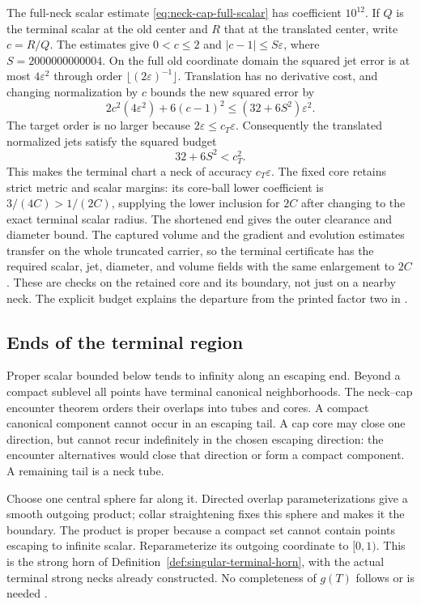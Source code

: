 The full-neck scalar estimate \eqref{eq:neck-cap-full-scalar} has coefficient
$10^{12}$. If $Q$ is the terminal scalar at the old center and $R$ that
at the translated center, write $c=R/Q$. The estimates give
$0<c\leq2$ and $|c-1|\leq S\varepsilon$, where
$S=2000000000004$. On the full old coordinate domain the squared jet
error is at most $4\varepsilon^2$ through order
$\lfloor(2\varepsilon)^{-1}\rfloor$. Translation has no derivative
cost, and changing normalization by $c$ bounds the new squared error by
\[
 2c^2(4\varepsilon^2)+6(c-1)^2
 \leq(32+6S^2)\varepsilon^2.
\]
The target order is no larger because $2\varepsilon\leq c_T\varepsilon$.
Consequently the translated normalized jets satisfy the squared budget
\begin{equation}
                         32+6S^2<c_T^2.
 \label{eq:singular-cap-budget}
\end{equation}
This makes the terminal chart a neck of accuracy $c_T\varepsilon$.
The fixed core retains strict metric and scalar margins: its core-ball lower
coefficient is $3/(4C)>1/(2C)$, supplying the lower inclusion for $2C$ after
changing to the exact terminal scalar radius. The shortened end gives the
outer clearance and diameter bound. The captured volume and the gradient and
evolution estimates transfer on the whole truncated carrier, so the terminal
certificate has the required scalar, jet, diameter, and volume fields with
the same enlargement to $2C$. These are checks on the retained core and its
boundary, not just on a nearby neck.
The explicit budget explains the departure from the printed factor two
in \cite[Lemma 11.23 and Claim 11.24, pp. 281--282]{MT2007}.

\subsection{Ends of the terminal region}

Proper scalar bounded below tends to infinity along an escaping end.
Beyond a compact sublevel all points have terminal canonical neighborhoods.
The neck--cap encounter theorem orders their overlaps into tubes and cores.
A compact canonical component cannot occur in an escaping tail. A cap
core may close one direction, but cannot recur indefinitely in the chosen
escaping direction: the encounter alternatives would close that direction
or form a compact component. A remaining tail is a neck tube.

Choose one central sphere far along it. Directed overlap parameterizations
give a smooth outgoing product; collar straightening fixes this sphere
and makes it the boundary. The product is proper because a compact set
cannot contain points escaping to infinite scalar. Reparameterize its
outgoing coordinate to $[0,1)$. This is the strong horn of
Definition~\ref{def:singular-terminal-horn}, with the actual terminal
strong necks already constructed. No completeness of $g(T)$ follows or
is needed \cite[Definitions 11.25--11.27 and Lemmas 11.28--11.30,
pp. 283--286]{MT2007}.

